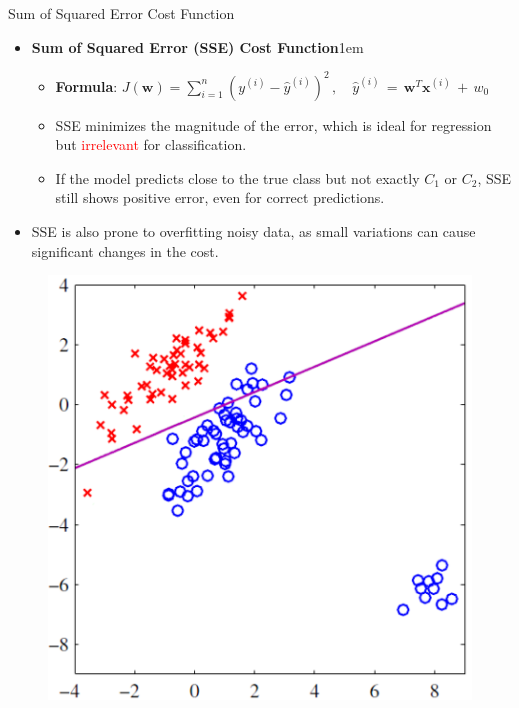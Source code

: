 \documentclass[serif, aspectratio=169]{beamer}
\begin{document}
\begin{frame}{Sum of Squared Error Cost Function}
    \begin{itemize}
        \item \textbf{Sum of Squared Error (SSE) Cost Function}\itemsep1em
        \medskip
        \begin{itemize}\itemsep0.8em
            \item \textbf{Formula}:
                \(
                J(\mathbf{w}) = \sum_{i=1}^{n} (y^{(i)} - \hat{y}^{(i)})^2 \, , \quad \hat{y}^{(i)} \, = \, \mathbf{w}^T\mathbf{x}^{(i)} \, + \, w_0
                \)
            \item \justifying SSE minimizes the magnitude of the error, which is ideal for regression but \textcolor{red}{irrelevant} for classification.
            \item \justifying If the model predicts close to the true class but not exactly \(C_1\) or \(C_2\), SSE still shows positive error, even for correct predictions.
        \end{itemize}
    \end{itemize}
    \begin{itemize}
        \item SSE is also prone to overfitting noisy data, as small variations can cause significant changes in the cost.
    \end{itemize}
    \endminipage
        \begin{figure}
            \centering
            \includegraphics[width=.65\linewidth]{pic/Figure_11.png}
        \end{figure}
    \endminipage
\end{frame}
\end{document}
